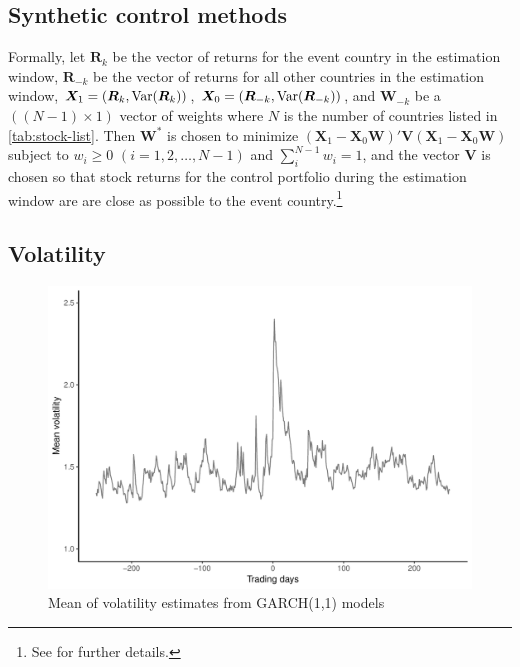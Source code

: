 \documentclass[12pt,final,fleqn]{article}
\theoremstyle{plain}
\newcommand\var{{\rm Var}}
\begin{document}
\clearpage
\newpage

\subsection{Synthetic control methods} \label{subsec: synth}

Formally, let $\boldsymbol{R}_{k}$ be the vector of returns for the event country in the estimation window, $\boldsymbol{R}_{-k}$ be the vector of returns for all other countries in the estimation window, $\boldsymbol{X}_1=(\boldsymbol{R}_{k},\var(\boldsymbol{R}_{k}))$, $\boldsymbol{X}_0=(\boldsymbol{R}_{-k},\var(\boldsymbol{R}_{-k}))$, and $\boldsymbol{W}_{-k}$ be a $((N-1) \times 1)$ vector of weights where $N$ is the number of countries listed in \autoref{tab:stock-list}. Then $\boldsymbol{W}^*$ is chosen to minimize $(\boldsymbol{X}_1-\boldsymbol{X}_0\boldsymbol{W})'\boldsymbol{V}(\boldsymbol{X}_1-\boldsymbol{X}_0\boldsymbol{W})$ subject to $w_i\geq0$ $(i = 1,2,\ldots,N-1)$ and $\sum_i^{N-1} w_i = 1$, and the vector $\boldsymbol{V}$ is chosen so that stock returns for the control portfolio during the estimation window are are close as possible to the event country.\footnote{See \citet{abadie2003economic} for further details.} 

\newpage

\subsection{Volatility} \label{subsec: volatility}

\begin{figure}[!htb]
\includegraphics[scale = 0.75]{../figs/mean-volatility.pdf}
\caption{Mean of volatility estimates from GARCH(1,1) models}
\label{fig:volatility}
\end{figure}
\end{document}

